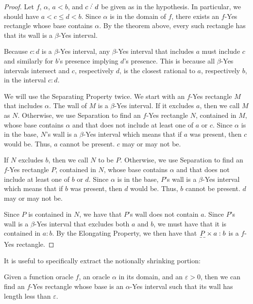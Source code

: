 \documentclass[12pt]{article}
\begin{document}
\begin{proof}
    Let $f$, $\alpha$, $a<b$, and $c\lte d$ be given as in the hypothesis. In particular, we should have $a< c \leq d < b$. Since $\alpha$ is in the domain of $f$, there exists an $f$-Yes rectangle whose base contains $\alpha$. By the theorem above, every such rectangle has that its wall is a $\beta$-Yes interval. 

    Because $c:d$ is a $\beta$-Yes interval, any $\beta$-Yes interval that includes $a$ must include $c$ and similarly for $b$'s presence implying $d$'s presence. This is because all $\beta$-Yes intervals intersect and $c$, respectively $d$, is the closest rational to $a$, respectively $b$, in the interval $c:d$.

    We will use the Separating Property twice. We start with an $f$-Yes rectangle $M$ that includes $\alpha$. The wall of $M$ is a $\beta$-Yes interval. If it excludes $a$, then we call $M$ as $N$. Otherwise, we use Separation to find an $f$-Yes rectangle $N$, contained in $M$, whose base contains $\alpha$ and that does not include at least one of $a$ or $c$. Since $\alpha$ is in the base, $N$'s wall is a $\beta$-Yes interval which means that if $a$ was present, then $c$ would be. Thus, $a$ cannot be present. $c$ may or may not be. 

    If $N$ excludes $b$, then we call $N$ to be $P$. Otherwise, we use Separation to find an $f$-Yes rectangle $P$, contained in $N$, whose base contains $\alpha$ and that does not include at least one of $b$ or $d$. Since $\alpha$ is in the base, $P$'s wall is a $\beta$-Yes interval which means that if $b$ was present, then $d$ would be. Thus, $b$ cannot be present. $d$ may or may not be. 

    Since $P$ is contained in $N$, we have that $P$'s wall does not contain $a$. Since $P$'s wall is a $\beta$-Yes interval that excludes both $a$ and $b$, we must have that it is contained in $a:b$. By the Elongating Property, we then have that $\base{P} \times a:b$ is a $f$-Yes rectangle. 

\end{proof}


It is useful to specifically extract the notionally shrinking portion:

\begin{corollary}
Given a function oracle $f$, an oracle $\alpha$ in its domain, and an $\varepsilon > 0$, then we can find an $f$-Yes rectangle whose base is an $\alpha$-Yes interval such that its wall has length less than $\varepsilon$.
\end{corollary}
\end{document}
